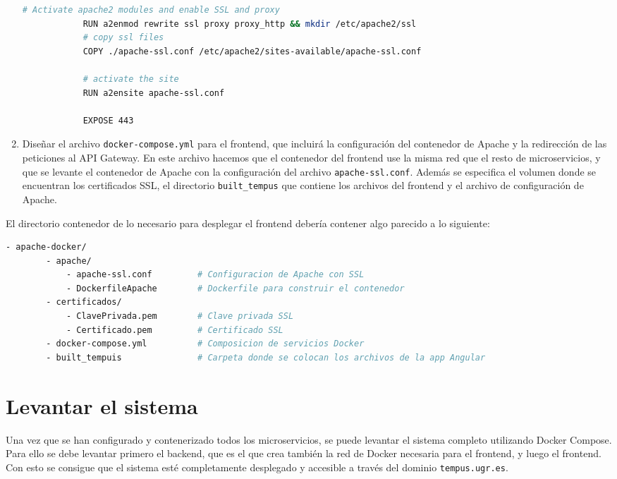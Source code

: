 \begin{enumerate}
\begin{lstlisting}[language=bash]
            # Activate apache2 modules and enable SSL and proxy
            RUN a2enmod rewrite ssl proxy proxy_http && mkdir /etc/apache2/ssl
            # copy ssl files
            COPY ./apache-ssl.conf /etc/apache2/sites-available/apache-ssl.conf

            # activate the site
            RUN a2ensite apache-ssl.conf

            EXPOSE 443
        \end{lstlisting}
    \item Diseñar el archivo \texttt{docker-compose.yml} para el frontend, que incluirá la configuración del contenedor de Apache y la redirección de las peticiones al API Gateway.
    En este archivo hacemos que el contenedor del frontend use la misma red que el resto de microservicios, y que se levante el contenedor de Apache con la configuración del archivo \texttt{apache-ssl.conf}.
    \newline
    Además se especifica el volumen donde se encuentran los certificados SSL, el directorio \texttt{built\_tempus} que contiene los archivos del frontend y el archivo de configuración de Apache.

\end{enumerate}

El directorio contenedor de lo necesario para desplegar el frontend debería contener algo parecido a lo siguiente:
\begin{lstlisting}[language=bash]
    - apache-docker/
        - apache/
            - apache-ssl.conf         # Configuracion de Apache con SSL
            - DockerfileApache        # Dockerfile para construir el contenedor
        - certificados/
            - ClavePrivada.pem        # Clave privada SSL
            - Certificado.pem         # Certificado SSL
        - docker-compose.yml          # Composicion de servicios Docker
        - built_tempuis               # Carpeta donde se colocan los archivos de la app Angular
\end{lstlisting}

\section{Levantar el sistema}
Una vez que se han configurado y contenerizado todos los microservicios, se puede levantar el sistema completo utilizando Docker Compose. Para ello se debe levantar primero el backend, que es el que crea también la red de Docker necesaria para el frontend, y luego el frontend.
\newline
Con esto se consigue que el sistema esté completamente desplegado y accesible a través del dominio \texttt{tempus.ugr.es}.

